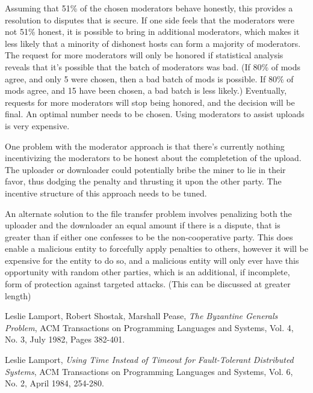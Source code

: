 \documentclass[twocolumn]{article}
\begin{document}
\begin{appendices}
Assuming that 51\% of the chosen moderators behave honestly, this provides a resolution to disputes that is secure.
If one side feels that the moderators were not 51\% honest, it is possible to bring in additional moderators, which makes it less likely that a minority of dishonest hosts can form a majority of moderators.
The request for more moderators will only be honored if statistical analysis reveals that it's possible that the batch of moderators was bad. (If 80\% of mods agree, and only 5 were chosen, then a bad batch of mods is possible. If 80\% of mods agree, and 15 have been chosen, a bad batch is less likely.)
Eventually, requests for more moderators will stop being honored, and the decision will be final.
An optimal number needs to be chosen.
Using moderators to assist uploads is very expensive.

One problem with the moderator approach is that there's currently nothing incentivizing the moderators to be honest about the completetion of the upload.
The uploader or downloader could potentially bribe the miner to lie in their favor, thus dodging the penalty and thrusting it upon the other party.
The incentive structure of this approach needs to be tuned.

An alternate solution to the file transfer problem involves penalizing both the uploader and the downloader an equal amount if there is a dispute, that is greater than if either one confesses to be the non-cooperative party.
This does enable a malicious entity to forcefully apply penalties to others, however it will be expensive for the entity to do so, and a malicious entity will only ever have this opportunity with random other parties, which is an additional, if incomplete, form of protection against targeted attacks.
(This can be discussed at greater length)

\end{appendices}

\begin{thebibliography}{2}

	Leslie Lamport, Robert Shostak, Marshall Pease,
	\emph{The Byzantine Generals Problem},
	ACM Transactions on Programming Languages and Systems, Vol. 4, No. 3, July 1982, Pages 382-401.

	Leslie Lamport,
	\emph{Using Time Instead of Timeout for Fault-Tolerant Distributed Systems},
	ACM Transactions on Programming Languages and Systems, Vol. 6, No. 2, April 1984, 254-280.

\end{thebibliography}
\end{document}

